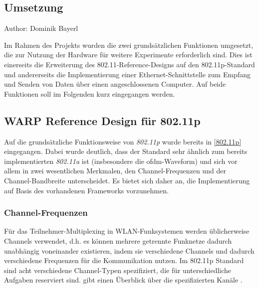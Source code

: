 \documentclass[letterpaper,11pt,ngerman]{article}
\begin{document}
\begin{onehalfspace}
\small
\normalsize

\newpage
\section{Umsetzung}\label{umsetzung}
\small Author: Dominik Bayerl\\
\Large

Im Rahmen des Projekts wurden die zwei grundsätzlichen Funktionen
umgesetzt, die zur Nutzung der Hardware für weitere Experimente
erforderlich sind. Dies ist einerseits die Erweiterung des
802.11-Reference-Designs auf den 802.11p-Standard und andererseits die
Implementierung einer Ethernet-Schnittstelle zum Empfang und Senden von
Daten über einen angeschlossenen Computer. Auf beide Funktionen soll im
Folgenden kurz eingegangen werden.

\subsection{WARP Reference Design für
802.11p}\label{warp-reference-design-fuxfcr-802.11p}

Auf die grundsätzliche Funktionsweise von \emph{802.11p} wurde bereits
in \cref{802.11p} eingegangen. Dabei wurde deutlich,
dass der Standard sehr ähnlich zum bereits implementierten
\emph{802.11a} ist (insbesondere die \ac{ofdm}-Waveform) und sich vor
allem in zwei wesentlichen Merkmalen, den Channel-Frequenzen und der
Channel-Bandbreite unterscheidet. Es bietet sich daher an, die
Implementierung auf Basis des vorhandenen Frameworks vorzunehmen.

\subsubsection{Channel-Frequenzen}\label{channel-frequenzen}

Für das Teilnehmer-Multiplexing in WLAN-Funksystemen werden
üblicherweise Channels verwendet, d.h. es können mehrere getrennte
Funknetze dadurch unabhängig voneinander existieren, indem sie
verschiedene Channels und dadurch verschiedene Frequenzen für die
Kommunikation nutzen. Im 802.11p Standard sind acht verschiedene
Channel-Typen spezifiziert, die für unterschiedliche Aufgaben reserviert
sind.  gibt einen Überblick über die
spezifizierten Kanäle \autocite{etsi}.


\end{onehalfspace}
\end{document}
